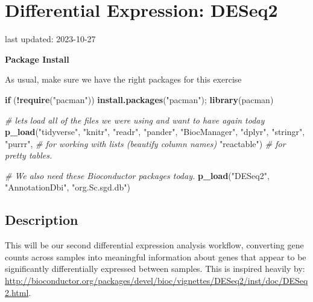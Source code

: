 \documentclass[
]{book}
\newenvironment{Shaded}{\begin{snugshade}}{\end{snugshade}}
\newcommand{\CommentTok}[1]{\textcolor[rgb]{0.56,0.35,0.01}{\textit{#1}}}
\newcommand{\ControlFlowTok}[1]{\textcolor[rgb]{0.13,0.29,0.53}{\textbf{#1}}}
\newcommand{\FunctionTok}[1]{\textcolor[rgb]{0.13,0.29,0.53}{\textbf{#1}}}
\newcommand{\NormalTok}[1]{#1}
\newcommand{\SpecialCharTok}[1]{\textcolor[rgb]{0.81,0.36,0.00}{\textbf{#1}}}
\newcommand{\StringTok}[1]{\textcolor[rgb]{0.31,0.60,0.02}{#1}}
\begin{document}
\hypertarget{differential-expression-deseq2}{%
\chapter{Differential Expression: DESeq2}\label{differential-expression-deseq2}}

last updated: 2023-10-27

\textbf{Package Install}

As usual, make sure we have the right packages for this exercise

\begin{Shaded}
\begin{Highlighting}[]
\ControlFlowTok{if}\NormalTok{ (}\SpecialCharTok{!}\FunctionTok{require}\NormalTok{(}\StringTok{"pacman"}\NormalTok{)) }\FunctionTok{install.packages}\NormalTok{(}\StringTok{"pacman"}\NormalTok{); }\FunctionTok{library}\NormalTok{(pacman)}

\CommentTok{\# let\textquotesingle{}s load all of the files we were using and want to have again today}
\FunctionTok{p\_load}\NormalTok{(}\StringTok{"tidyverse"}\NormalTok{, }\StringTok{"knitr"}\NormalTok{, }\StringTok{"readr"}\NormalTok{,}
       \StringTok{"pander"}\NormalTok{, }\StringTok{"BiocManager"}\NormalTok{, }
       \StringTok{"dplyr"}\NormalTok{, }\StringTok{"stringr"}\NormalTok{, }
       \StringTok{"purrr"}\NormalTok{, }\CommentTok{\# for working with lists (beautify column names)}
       \StringTok{"reactable"}\NormalTok{) }\CommentTok{\# for pretty tables.}

\CommentTok{\# We also need these Bioconductor packages today.}
\FunctionTok{p\_load}\NormalTok{(}\StringTok{"DESeq2"}\NormalTok{, }\StringTok{"AnnotationDbi"}\NormalTok{, }\StringTok{"org.Sc.sgd.db"}\NormalTok{)}
\end{Highlighting}
\end{Shaded}

\hypertarget{description-3}{%
\section{Description}\label{description-3}}

This will be our second differential expression analysis workflow, converting gene counts across samples into meaningful information about genes that appear to be significantly differentially expressed between samples. This is inspired heavily by: \url{http://bioconductor.org/packages/devel/bioc/vignettes/DESeq2/inst/doc/DESeq2.html}.
\end{document}
